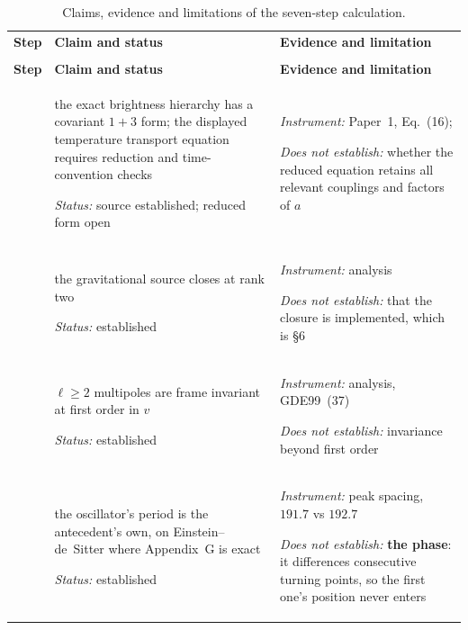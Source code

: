 \begingroup
\footnotesize
\renewcommand{\arraystretch}{1.2}
\setlength{\tabcolsep}{4pt}
\begin{longtable}{@{}>{\raggedright\arraybackslash}p{11mm}
                      >{\raggedright\arraybackslash}p{64mm}
                      >{\raggedright\arraybackslash}p{77mm}@{}}
\caption{Claims, evidence and limitations of the seven-step calculation.}
\label{tab:status}\enlargethispage{\baselineskip}\\
\toprule
\textbf{Step} & \textbf{Claim and status} & \textbf{Evidence and limitation}\\
\midrule
\endfirsthead
\multicolumn{3}{@{}l}{\small\emph{Table \thetable\ (continued)}}\\
\toprule
\textbf{Step} & \textbf{Claim and status} & \textbf{Evidence and limitation}\\
\midrule
\endhead
\bottomrule
\endfoot
1 & the exact brightness hierarchy has a covariant $1+3$ form; the displayed temperature transport equation requires reduction and time-convention checks\par\emph{Status:} source established; reduced form open & \emph{Instrument:} Paper~1, Eq.~(16); \citet{GebbieDunsbyEllis2000}\par\emph{Does not establish:} whether the reduced equation retains all relevant couplings and factors of $a$ \\
\addlinespace[4pt]
2 & the gravitational source closes at rank two\par\emph{Status:} established & \emph{Instrument:} analysis\par\emph{Does not establish:} that the closure is implemented, which is \S6 \\
\addlinespace[4pt]
3 & $\ell\ge2$ multipoles are frame invariant at first order in $v$\par\emph{Status:} established & \emph{Instrument:} analysis, GDE99~(37)\par\emph{Does not establish:} invariance beyond first order \\
\addlinespace[4pt]
4 & the oscillator's period is the antecedent's own, on Einstein--de~Sitter where Appendix~G is exact\par\emph{Status:} established & \emph{Instrument:} peak spacing, $191.7$ vs $192.7$\par\emph{Does not establish:} \textbf{the phase}: it differences consecutive turning points, so the first one's position never enters \\

\end{longtable}
